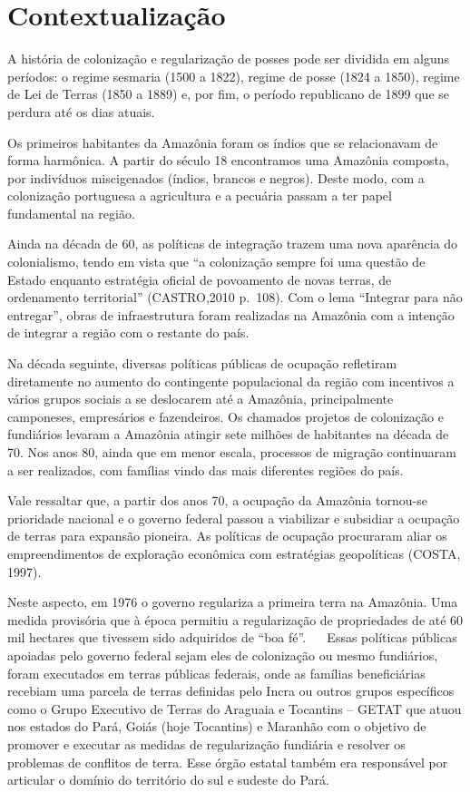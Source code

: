\documentclass[
  letterpaper,
]{report}
\begin{document}
\div


\hypertarget{contextualizauxe7uxe3o}{%
\chapter{Contextualização}\label{contextualizauxe7uxe3o}}

A história de colonização e regularização de posses pode ser dividida em
alguns períodos: o regime sesmaria (1500 a 1822), regime de posse (1824
a 1850), regime de Lei de Terras (1850 a 1889) e, por fim, o período
republicano de 1899 que se perdura até os dias atuais.~~~

Os primeiros habitantes da Amazônia foram os índios que se relacionavam
de forma harmônica. A partir do século 18 encontramos uma Amazônia
composta, por indivíduos miscigenados (índios, brancos e negros). Deste
modo, com a colonização portuguesa a agricultura e a pecuária passam a
ter papel fundamental na região.~~~

Ainda na década de 60, as políticas de integração trazem uma nova
aparência do colonialismo, tendo em vista que ``a colonização sempre foi
uma questão de Estado enquanto estratégia oficial de povoamento de novas
terras, de ordenamento territorial'' (CASTRO,2010 p.~108). Com o lema
``Integrar para não entregar'', obras de infraestrutura foram realizadas
na Amazônia com a intenção de integrar a região com o restante do
país.~~~

Na década seguinte, diversas políticas públicas de ocupação refletiram
diretamente no aumento do contingente populacional da região com
incentivos a vários grupos sociais a se deslocarem até a Amazônia,
principalmente camponeses, empresários e fazendeiros. Os chamados
projetos de colonização e fundiários levaram a Amazônia atingir sete
milhões de habitantes na década de 70. Nos anos 80, ainda que em menor
escala, processos de migração continuaram a ser realizados, com famílias
vindo das mais diferentes regiões do país.~~

Vale ressaltar que, a partir dos anos 70, a ocupação da Amazônia
tornou-se prioridade nacional e o governo federal passou a viabilizar e
subsidiar a ocupação de terras para expansão pioneira. As políticas de
ocupação procuraram aliar os empreendimentos de exploração econômica com
estratégias geopolíticas (COSTA, 1997).~~

Neste aspecto, em 1976 o governo regulariza a primeira terra na
Amazônia. Uma medida provisória que à época permitiu a regularização de
propriedades de até 60 mil hectares que tivessem sido adquiridos de
``boa fé''.~ ~ Essas políticas públicas apoiadas pelo governo federal
sejam eles de colonização ou mesmo fundiários, foram executados em
terras públicas federais, onde as famílias beneficiárias recebiam uma
parcela de terras definidas pelo Incra ou outros grupos específicos como
o Grupo Executivo de Terras do Araguaia e Tocantins -- GETAT que atuou
nos estados do Pará, Goiás (hoje Tocantins) e Maranhão com o objetivo de
promover e executar as medidas de regularização fundiária e resolver os
problemas de conflitos de terra. Esse órgão estatal também era
responsável por articular o domínio do território do sul e sudeste do
Pará.~
\end{document}
